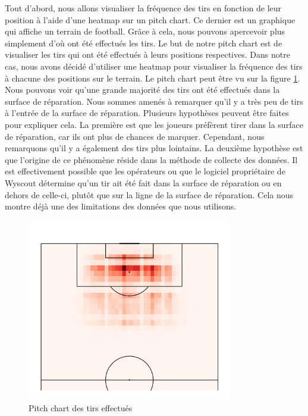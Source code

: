 \documentclass[12pt]{article}
\begin{document}
Tout d'abord, nous allons visualiser la fréquence des tirs en fonction de leur position à l'aide d'une heatmap sur un pitch chart.
Ce dernier est un graphique qui affiche un terrain de football.
Grâce à cela, nous pouvons apercevoir plus simplement d'où ont été effectués les tirs.
Le but de notre pitch chart est de visualiser les tirs qui ont été effectués à leurs positions respectives.
Dans notre cas, nous avons décidé d'utiliser une heatmap pour visualiser la fréquence des tirs à chacune des positions sur le terrain.
Le pitch chart peut être vu sur la figure \ref{fig:pitch_chart}.
Nous pouvons voir qu'une grande majorité des tirs ont été effectués dans la surface de réparation.
Nous sommes amenés à remarquer qu'il y a très peu de tirs à l'entrée de la surface de réparation.
Plusieurs hypothèses peuvent être faites pour expliquer cela.
La première est que les joueurs préfèrent tirer dans la surface de réparation, car ils ont plus de chances de marquer.
Cependant, nous remarquons qu'il y a également des tirs plus lointains.
La deuxième hypothèse est que l'origine de ce phénomène réside dans la méthode de collecte des données.
Il est effectivement possible que les opérateurs ou que le logiciel propriétaire de Wyscout détermine qu'un tir ait été fait dans la surface de réparation ou en dehors de celle-ci, plutôt que sur la ligne de la surface de réparation.
Cela nous montre déjà une des limitations des données que nous utilisons.
\begin{figure}[htp]
    \centering
    \includegraphics[width=0.8\textwidth]{img/pitchChartFrequency.png}
    \caption{Pitch chart des tirs effectués}
    \label{fig:pitch_chart}
\end{figure}
\end{document}
